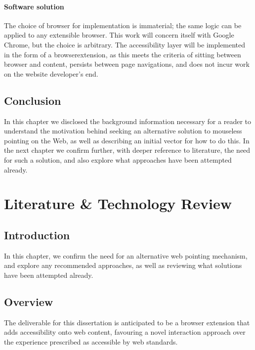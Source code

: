 \documentclass[11pt,openright,a4paper]{report}
\begin{document}
\subsubsection{Software solution}
\label{sec:softwaresolution}
The choice of browser for implementation is immaterial; the same logic can be applied to any extensible browser. This work will concern itself with Google Chrome, but the choice is arbitrary.
The accessibility layer will be implemented in the form of a \gls{browserextension}, as this meets the criteria of sitting between browser and content, persists between page navigations, and does not incur work on the website developer's end.
\section{Conclusion}
In this chapter we disclosed the background information necessary for a reader to understand the motivation behind seeking an alternative solution to mouseless pointing on the Web, as well as describing an initial vector for how to do this. In the next chapter we confirm further, with deeper reference to literature, the need for such a solution, and also explore what approaches have been attempted already.

\chapter{Literature \& Technology Review}
\label{chap:litreview}
\section{Introduction}
In this chapter, we confirm the need for an alternative web pointing mechanism, and explore any recommended approaches, as well as reviewing what solutions have been attempted already.
\section{Overview}
The deliverable for this dissertation is anticipated to be a browser extension that adds accessibility onto web content, favouring a novel interaction approach over the experience prescribed as accessible by web standards.
\end{document}
